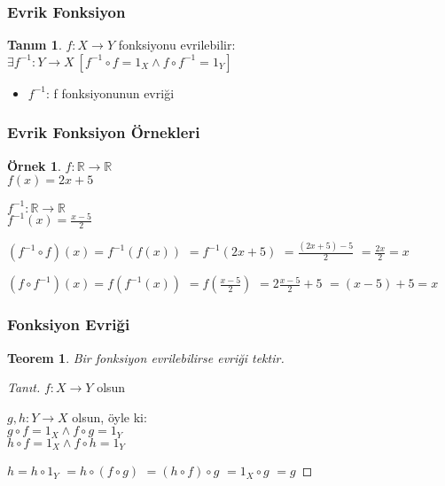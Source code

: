 \documentclass[dvipsnames]{beamer}
\theoremstyle{definition}
\newtheorem{tanim}[theorem]{Tanım}
\theoremstyle{example}
\newtheorem{ornek}[theorem]{Örnek}
\theoremstyle{plain}
\newtheorem{teorem}[theorem]{Teorem}
\begin{document}
\begin{frame}
  \frametitle{Evrik Fonksiyon}

  \begin{tanim}
    $f: X \rightarrow Y$ fonksiyonu \alert{evrilebilir}:\\
      $\exists f^{-1}: Y \rightarrow X~[f^{-1} \circ f = 1_X
                                      \wedge f \circ f^{-1} = 1_Y]$

    \begin{itemize}
      \item $f^{-1}$: f fonksiyonunun \alert{evriği}
    \end{itemize}
  \end{tanim}
\end{frame}

\begin{frame}
  \frametitle{Evrik Fonksiyon Örnekleri}

  \begin{ornek}
    $f: \mathbb{R} \rightarrow \mathbb{R}$\\
    $f(x) = 2x + 5$

    \pause
    \bigskip
    $f^{-1}: \mathbb{R} \rightarrow \mathbb{R}$\\
    $f^{-1}(x) = \frac{x - 5}{2}$

    \pause
    \bigskip
    $(f^{-1} \circ f)(x) = f^{-1}(f(x))$
    \pause
    $ = f^{-1}(2x + 5)$
    \pause
    $ = \frac{(2x + 5) - 5}{2}$
    \pause
    $ = \frac{2x}{2} = x$
    \medskip

    \pause
    $(f \circ f^{-1})(x) = f(f^{-1}(x))$
    \pause
    $ = f(\frac{x - 5}{2})$
    \pause
    $ = 2 \frac{x - 5}{2} + 5$
    \pause
    $ = (x - 5) + 5 = x$
  \end{ornek}
\end{frame}

\begin{frame}
  \frametitle{Fonksiyon Evriği}

  \begin{teorem}
    Bir fonksiyon evrilebilirse evriği tektir.
  \end{teorem}

  \pause
  \begin{proof}[Tanıt]
    $f: X \rightarrow Y$ olsun

    \pause
    \medskip
    $g,h: Y \rightarrow X$ olsun, öyle ki:\\
    $g \circ f = 1_X \wedge f \circ g = 1_Y$\\
    $h \circ f = 1_X \wedge f \circ h = 1_Y$

    \pause
    \medskip
    $h = h \circ 1_Y$
    \pause
    $ = h \circ (f \circ g)$
    \pause
    $ = (h \circ f) \circ g$
    \pause
    $ = 1_X \circ g$
    \pause
    $ = g$
  \end{proof}
\end{frame}
\end{document}
